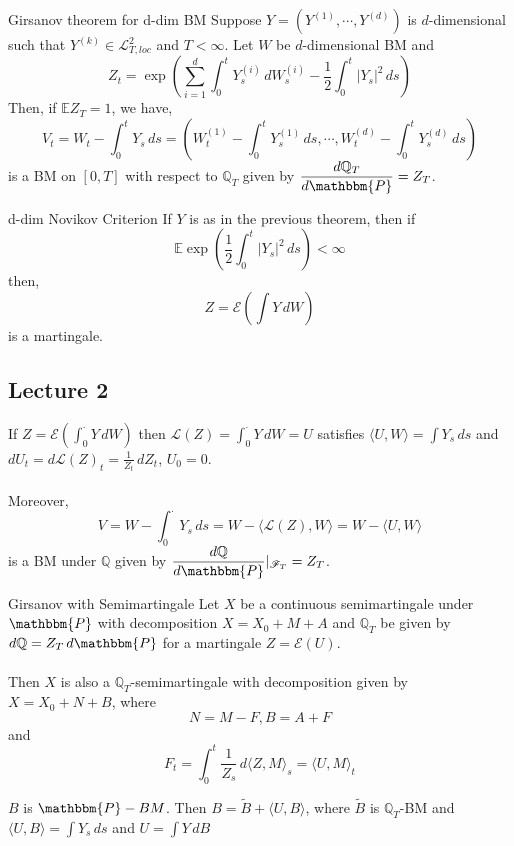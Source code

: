 \documentclass[12pt,a4paper]{article}
\newcommand{\Q}{\mathbb{Q}}
\newcommand{\E}{\mathbb{E}}
\begin{document}
    \begin{theorem}{Girsanov theorem for d-dim BM}{}
        Suppose $Y = (Y^{(1)},\cdots, Y^{(d)})$ is $d$-dimensional such that $Y^{(k)}\in\mathcal{L}^2_{T,loc}$ and $T<\infty$. Let $W$ be $d$-dimensional BM and
        $$
        Z_t = \exp\left(\sum_{i=1}^d \int_0^t Y_s^{(i)}\, dW_s^{(i)}-\frac{1}{2}\int_0^t |Y_s|^2\, ds\right)
        $$
        Then, if $\E Z_T=1$, we have,
        $$
        V_t = W_t - \int_0^t Y_s\, ds = (W_t^{(1)}-\int_0^t Y_s^{(1)}\, ds,\cdots, W_t^{(d)}-\int_0^t Y_s^{(d)}\, ds)
        $$
        is a BM on $[0,T]$ with respect to $\Q_T$ given by $\dfrac{d\Q_T}{d\mathbbm{P}}= Z_T$.
    \end{theorem}
    \begin{theorem}{d-dim Novikov Criterion}{}
        If $Y$ is as in the previous theorem, then if
        $$
        \E\exp\left(\frac{1}{2}\int_0^t |Y_s|^2\, ds\right)<\infty
        $$
        then,
        $$
        Z = \mathcal{E}(\int Y\, dW)
        $$
        is a martingale.
    \end{theorem}
    \pagebreak
    \subsection{Lecture 2}
    \begin{remark}{}{}
        If $Z = \mathcal{E}(\int_0^\cdot Y \, dW)$ then $\mathcal{L}(Z) = \int_0^\cdot Y\, dW = U$ satisfies $\langle U,W\rangle = \int Y_s\, ds$ and $dU_t = d\mathcal{L}(Z)_t = \frac{1}{Z_t}\, dZ_t$, $U_0=0$.\\
        \\
        Moreover,
        $$
        V = W - \int_0^\cdot Y_s\, ds = W - \langle \mathcal{L}(Z), W\rangle = W-\langle U,W\rangle
        $$
        is a BM under $\Q$ given by $\dfrac{d\Q}{d\mathbbm{P}}|_{\mathscr{F}_T} = Z_T$.
    \end{remark}
    \begin{theorem}{Girsanov with Semimartingale}{}
        Let $X$ be a continuous semimartingale under $\mathbbm{P}$ with decomposition $X = X_0 + M+A$ and $\Q_T$ be given by $d\Q = Z_T\, d\mathbbm{P}$ for a martingale $Z = \mathcal{E}(U)$.\\
        \\
        Then $X$ is also a $\Q_T$-semimartingale with decomposition given by $X = X_0+N+B$, where
        $$
        N = M-F, B = A+F
        $$
        and 
        $$
        F_t = \int_0^t \frac{1}{Z_s}\,d\langle Z,M\rangle_s = \langle U, M\rangle_t
        $$
    \end{theorem}
    \begin{example}{}{}
        $B$ is $\mathbbm{P}-BM$. Then $B = \tilde B + \langle U, B\rangle$, where $\tilde B$ is $\Q_T$-BM and $\langle U,B\rangle = \int Y_s\, ds$ and $U = \int Y \, dB$
    \end{example}
    \pagebreak
\end{document}
